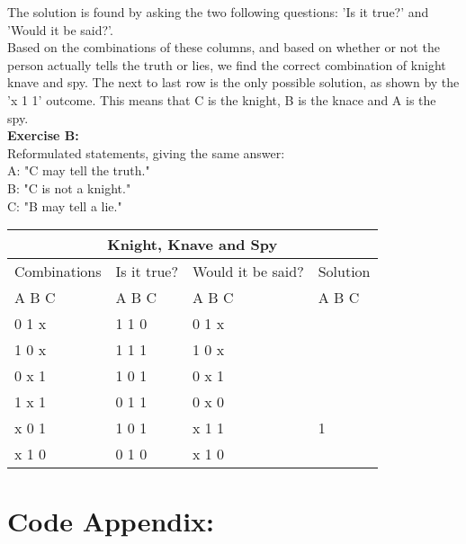 \documentclass[11pt]{amsart}
\begin{document}
The solution is found by asking the two following questions: 'Is it true?' and 'Would it be said?'. \\

Based on the combinations of these columns, and based on whether or not the person actually tells the truth or lies,
we find the correct combination of knight knave and spy. The next to last row is the only possible solution,
as shown by the 'x 1 1' outcome. This means that C is the knight, B is the knace and A is the spy. \\


\textbf{Exercise B:} \\
Reformulated statements, giving the same answer:\\

	A: "C may tell the truth."\\
	B: "C is not a knight."\\
	C: "B may tell a lie." \\


\begin{tabular}{ |p{3cm}||p{3cm}|p{3cm}|p{3cm}|  }
	\hline
	\multicolumn{4}{|c|}{Knight, Knave and Spy} \\
	\hline
	 Combinations & Is it true? & Would it be said? & Solution  \\ A  B  C   &   A  B  C  &   A  B  C & A  B  C \\
	\hline
	  0   1   x  	& 1	1	0   & 0 1 x	&  \\
	  1   0   x		& 1	1	1  	& 1 0 x &  \\
	  0   x   1 	&	1	0	1 	& 0 x 1	&  \\
	  1   x   1  	&	0	1	1 	& 0 x 0	&  \\
	  x   0   1		& 1	0	1  	& x 1 1	& 1\\
	  x   1   0		& 0	1	0  	& x 1 0 &  \\

	\hline
\end{tabular}


\section{Code Appendix:}
\end{document}
